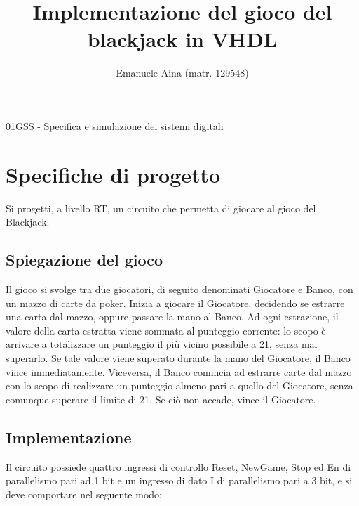 \documentclass [11pt,a4paper,oneside,draft]{article}
\title{Implementazione del gioco del blackjack in VHDL}
\author{Emanuele Aina (matr. 129548)}
\date{}
\begin{document}
\maketitle

\begin{center}
\small{01GSS - Specifica e simulazione dei sistemi digitali}
\end{center}

\section{Specifiche di progetto}
Si progetti, a livello RT, un circuito che permetta di giocare al gioco del Blackjack.

\subsection{Spiegazione del gioco}
Il gioco si svolge tra due giocatori, di seguito denominati
Giocatore e Banco, con un mazzo di carte da poker. Inizia a giocare il Giocatore,
decidendo se estrarre una carta dal mazzo, oppure passare la mano al Banco. Ad ogni
estrazione, il valore della carta estratta viene sommata al punteggio corrente: lo scopo
è arrivare a totalizzare un punteggio il più vicino possibile a 21, senza mai superarlo.
Se tale valore viene superato durante la mano del Giocatore, il Banco vince
immediatamente. Viceversa, il Banco comincia ad estrarre carte dal mazzo con lo
scopo di realizzare un punteggio almeno pari a quello del Giocatore, senza comunque
superare il limite di 21. Se ciò non accade, vince il Giocatore.

\subsection{Implementazione}
Il circuito possiede quattro ingressi di controllo Reset, NewGame,
Stop ed En di parallelismo pari ad 1 bit e un ingresso di dato I di parallelismo pari a
3 bit, e si deve comportare nel seguente modo:
\end{document}
